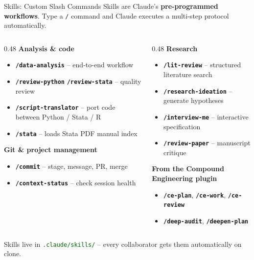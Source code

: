 \documentclass[aspectratio=169,11pt,dvipsnames]{beamer}
\newcommand{\skill}[1]{\texttt{\textcolor{defaultclr}{\textbf{/#1}}}}
\newcommand{\file}[1]{\textcolor{darkgreen}{\nolinkurl{#1}}}
\begin{document}
\begin{frame}{Skills: Custom Slash Commands}
  Skills are Claude's \textbf{pre-programmed workflows}. Type a \texttt{/} command
  and Claude executes a multi-step protocol automatically.

  \vspace{0.3cm}
  \begin{columns}[T]
    \begin{column}{0.48\textwidth}
      \textbf{Analysis \& code}
      \begin{itemize}
        \item \skill{data-analysis} -- end-to-end workflow
        \item \skill{review-python} \skill{review-stata} -- quality review
        \item \skill{script-translator} -- port code between Python / Stata / R
        \item \skill{stata} -- loads Stata PDF manual index
      \end{itemize}
      \vspace{0.2cm}
      \textbf{Git \& project management}
      \begin{itemize}
        \item \skill{commit} -- stage, message, PR, merge
        \item \skill{context-status} -- check session health
      \end{itemize}
    \end{column}
    \begin{column}{0.48\textwidth}
      \textbf{Research}
      \begin{itemize}
        \item \skill{lit-review} -- structured literature search
        \item \skill{research-ideation} -- generate hypotheses
        \item \skill{interview-me} -- interactive specification
        \item \skill{review-paper} -- manuscript critique
      \end{itemize}
      \vspace{0.2cm}
      \textbf{From the Compound Engineering plugin}
      \begin{itemize}
        \item \skill{ce-plan}, \skill{ce-work}, \skill{ce-review}
        \item \skill{deep-audit}, \skill{deepen-plan}
      \end{itemize}
    \end{column}
  \end{columns}
  \vspace{0.2cm}
  \small Skills live in \file{.claude/skills/} -- every collaborator gets them automatically on clone.
\end{frame}
\end{document}
